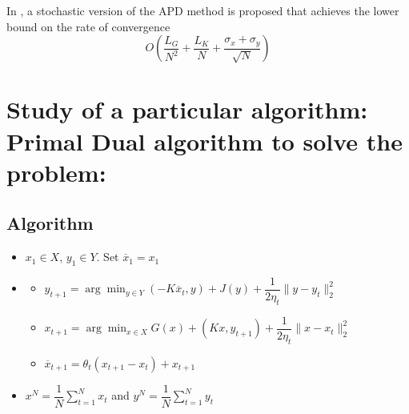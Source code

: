 \documentclass[12pt,reqno]{amsart}
\numberwithin{equation}{section}
\begin{document}
In \cite{ChenLanOuyang}, a stochastic version of the APD method is proposed that achieves the lower bound on the rate 
of convergence
$$
O(\dfrac{L_{G}}{N^{2}} + \dfrac{L_{K}}{N} + \dfrac{\sigma_{x} + \sigma_{y}}{\sqrt{N}})
$$

%

\section{Study of a particular algorithm: Primal Dual algorithm to solve the problem: }

\subsection{Algorithm}

\begin{itemize}
\item $x_{1} \in X$, $y_{1} \in Y$. Set $\overline{x}_{1} = x_{1}$
\item

\begin{itemize}
\item $y_{t+1} = \arg\min_{y \in Y} (-K\overline{x}_{t},y) + J(y) + \dfrac{1}{2\eta_{t}} \lVert y - y_{t} \rVert_{2}^{2}$
\item $x_{t+1} = \arg\min_{x \in X} G(x) + (Kx,y_{t+1}) + \dfrac{1}{2\eta_{t}}\lVert x - x_{t} \rVert_{2}^{2} $
\item $\overline{x}_{t+1} = \theta_{t}(x_{t+1} - x_{t}) + x_{t+1}$
\end{itemize}

\item $x^{N} = \dfrac{1}{N}\sum_{t=1}^{N} x_{t}$ and $y^{N} = \dfrac{1}{N}\sum_{t=1}^{N} y_{t}$
\end{itemize}
\end{document}
